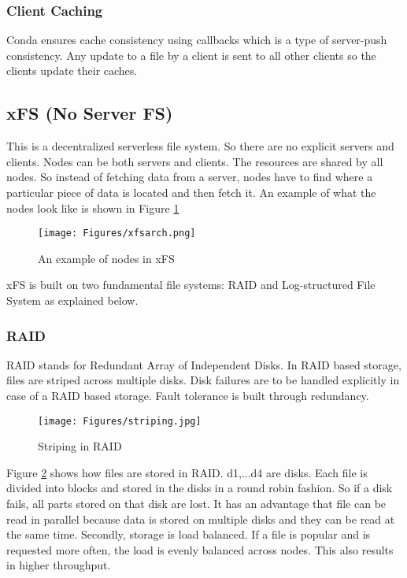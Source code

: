 \documentclass[twoside]{article}
\begin{document}
\subsubsection{Client Caching}
Conda ensures cache consistency using callbacks which is a  type of server-push consistency. Any update to a file by a client is sent to all other clients so the clients update their caches.


\subsection{xFS (No Server FS)}
This is a decentralized serverless file system. So there are no explicit servers and clients. Nodes can be both servers and clients. The resources are shared by all nodes. So instead of fetching data from a server, nodes have to find where a particular piece of data is located and then fetch it. An example of what the nodes look like is shown in Figure \ref{fig:xfsarch}
\begin{figure}[htbp]
\centering
\texttt{[image: Figures/xfsarch.png]}
\caption{An example of nodes in xFS} \label{fig:xfsarch}
\end{figure}

xFS is built on two fundamental file systems: RAID and Log-structured File System as explained below.

\subsubsection{RAID}
RAID stands for Redundant Array of Independent Disks. In RAID based storage,  files are striped across multiple disks. Disk failures are to be handled explicitly in case of a RAID based storage. Fault tolerance is built through redundancy. 

\begin{figure}[htbp]
\centering
\texttt{[image: Figures/striping.jpg]}
\caption{Striping in RAID} \label{fig:striping}
\end{figure}
Figure \ref{fig:striping} shows how files are stored in RAID. d1,...d4 are disks. Each file is divided into blocks and stored in the disks in a round robin fashion. So if a disk fails, all parts stored on that disk are lost. It has an advantage that file can be read in parallel because data is stored on multiple disks and they can be read at the same time. Secondly, storage is load balanced. If a file is popular and is requested more often, the load is evenly balanced across nodes. This also results in higher throughput.
\end{document}

